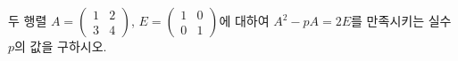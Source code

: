 두 행렬 $A=\begin{pmatrix} 1 & 2 \\ 3 & 4 \end{pmatrix}$, $E=\begin{pmatrix} 1 & 0 \\ 0 & 1 \end{pmatrix}$에 대하여 $A^2-pA=2E$를 만족시키는 실수 $p$의 값을 구하시오.
